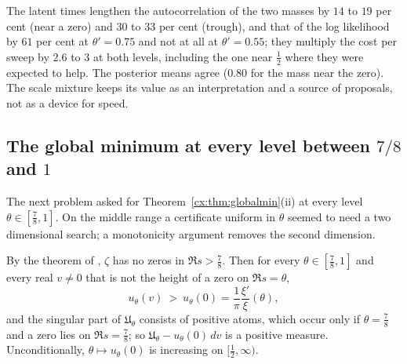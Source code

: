 \noindent The latent times lengthen the autocorrelation of the two masses by $14$ to $19$ per cent (near a zero) and $30$ to $33$ per cent (trough), and that of the log likelihood by $61$ per cent at $\theta'=0.75$ and not at all at $\theta'=0.55$; they multiply the cost per sweep by $2.6$ to $3$ at both levels, including the one near $\tfrac12$ where they were expected to help. The posterior means agree ($0.80$ for the mass near the zero). The scale mixture keeps its value as an interpretation and a source of proposals, not as a device for speed.

\subsection{The global minimum at every level between $7/8$ and $1$}\label{cx:sec:uniform}

The next problem asked for Theorem~\ref{cx:thm:globalmin}(ii) at every level $\theta\in[\tfrac78,1]$. On the middle range a certificate uniform in $\theta$ seemed to need a two dimensional search; a monotonicity argument removes the second dimension.

\begin{theorem}\label{cx:thm:uniform}
By the theorem of \cite{OAI26a}, $\zeta$ has no zeros in $\Re s>\tfrac78$. Then for every $\theta\in[\tfrac78,1]$ and every real $v\ne0$ that is not the height of a zero on $\Re s=\theta$,
\[
u_\theta(v)\ >\ u_\theta(0)=\frac1\pi\frac{\xi'}{\xi}(\theta),
\]
and the singular part of $\mathfrak U_\theta$ consists of positive atoms, which occur only if $\theta=\tfrac78$ and a zero lies on $\Re s=\tfrac78$; so $\mathfrak U_\theta-u_\theta(0)\,dv$ is a positive measure. Unconditionally, $\theta\mapsto u_\theta(0)$ is increasing on $[\tfrac12,\infty)$.
\end{theorem}

